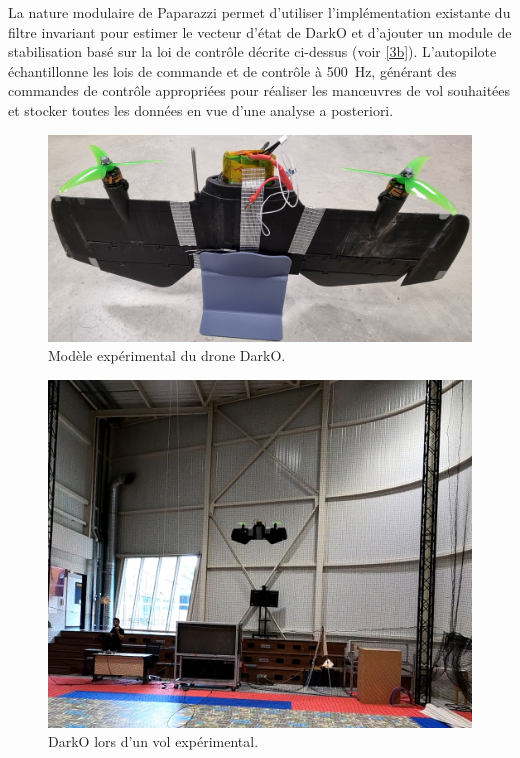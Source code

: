 La nature modulaire de Paparazzi permet d'utiliser l'implémentation existante du filtre invariant pour estimer le vecteur d'état de DarkO et d'ajouter un module de stabilisation basé sur la loi de contrôle décrite ci-dessus (voir \ref{3b}). L'autopilote échantillonne les lois de commande et de contrôle à \SI{500}{\hertz}, générant des commandes de contrôle appropriées pour réaliser les manœuvres de vol souhaitées et stocker toutes les données en vue d'une analyse a posteriori.

\begin{figure}[ht]
    \centering
    \includegraphics[width=0.7\columnwidth]{figures/DarkOModelfinal.jpg}
   \vspace{-0.2cm}\caption{Modèle expérimental du drone DarkO.}
    \label{DarkO1}
\end{figure}
\begin{figure}[ht]
    \centering
    \includegraphics[width=0.8\columnwidth]{figures/DarkOFlighthope.png}
    \vspace{-0.2cm}\caption{DarkO lors d'un vol expérimental.}
    \label{DarkO2}
\end{figure}

